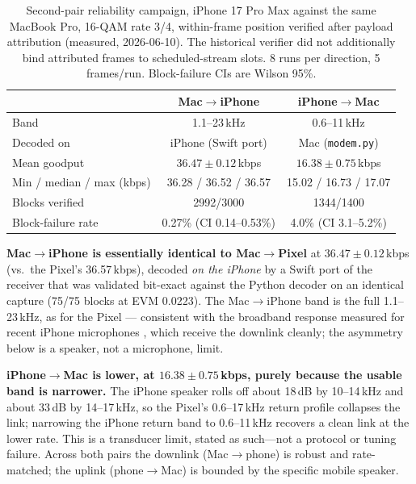 \documentclass[11pt]{article}
\begin{document}
\begin{table}[t]
\centering
\caption{Second-pair reliability campaign, iPhone 17 Pro Max against the same
MacBook Pro, 16-QAM rate 3/4, within-frame position verified after payload
attribution (measured, 2026-06-10). The historical verifier did not additionally
bind attributed frames to scheduled-stream slots. 8 runs per direction,
5 frames/run. Block-failure CIs are Wilson 95\%.}
\label{tab:iphone}
\begin{tabular}{lcc}
\toprule
 & Mac$\rightarrow$iPhone & iPhone$\rightarrow$Mac \\
\midrule
Band & 1.1--23\,kHz & 0.6--11\,kHz \\
Decoded on & iPhone (Swift port) & Mac (\texttt{modem.py}) \\
Mean goodput & $36.47 \pm 0.12$\,kbps & $16.38 \pm 0.75$\,kbps \\
Min / median / max (kbps) & 36.28 / 36.52 / 36.57 & 15.02 / 16.73 / 17.07 \\
Blocks verified & 2992/3000 & 1344/1400 \\
Block-failure rate & 0.27\% (CI 0.14--0.53\%) & 4.0\% (CI 3.1--5.2\%) \\
\bottomrule
\end{tabular}
\end{table}

\textbf{Mac$\rightarrow$iPhone is essentially identical to Mac$\rightarrow$Pixel}
at $36.47 \pm 0.12$\,kbps (vs.\ the Pixel's 36.57\,kbps), decoded \emph{on the
iPhone} by a Swift port of the receiver that was validated bit-exact against the
Python decoder on an identical capture (75/75 blocks at EVM 0.0223). The
Mac$\rightarrow$iPhone band is the full 1.1--23\,kHz, as for the Pixel ---
consistent with the broadband response measured for recent iPhone microphones
\cite{iphonemic}, which receive the downlink cleanly; the asymmetry below is a
speaker, not a microphone, limit.

\textbf{iPhone$\rightarrow$Mac is lower, at $16.38 \pm 0.75$\,kbps, purely
because the usable band is narrower.} The iPhone speaker rolls off about 18\,dB
by 10--14\,kHz and about 33\,dB by 14--17\,kHz, so the Pixel's 0.6--17\,kHz
return profile collapses the link; narrowing the iPhone return band to
0.6--11\,kHz recovers a clean link at the lower rate. This is a transducer
limit, stated as such---not a protocol or tuning failure. Across both pairs the
downlink (Mac$\rightarrow$phone) is robust and rate-matched; the uplink
(phone$\rightarrow$Mac) is bounded by the specific mobile speaker.
\end{document}
